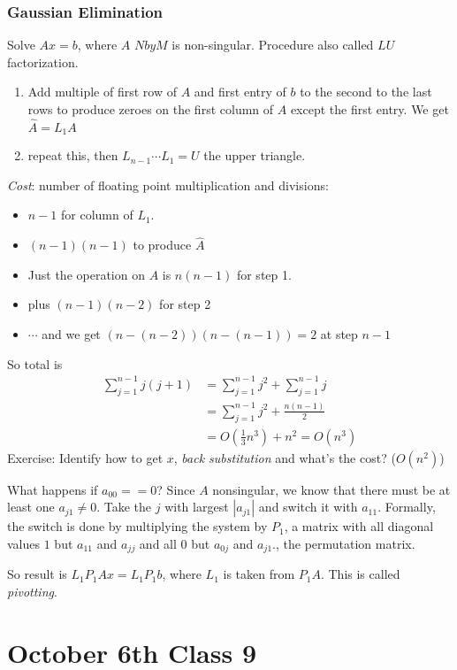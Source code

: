 \subsubsection{Gaussian Elimination}
\label{sec:gaussian}
Solve $Ax=b$, where $A$ $NbyM$ is non-singular. Procedure also called $LU$
factorization.
\begin{enumerate}
\item Add multiple of first row of $A$ and first entry of $b$ to the
  second to the last rows to produce zeroes on the first column of $A$
  except the first entry. We get $\hat A = L_1A$
\item repeat this, then $L_{n-1}\cdots L_1=U$ the upper triangle.
\end{enumerate}

\emph{Cost}: number of floating point multiplication and divisions:
\begin{itemize}
\item $n-1$ for column of $L_1$.
\item $(n-1)(n-1)$  to produce $\hat A$
\item Just the operation on $A$ is $n(n-1)$ for step 1.
\item plus $(n-1)(n-2)$ for step 2
\item $\cdots$ and we get $(n-(n-2))(n-(n-1)) = 2$ at step $n-1$
\end{itemize}
So total is 
\begin{align*}
  \sum_{j=1}^{n-1}j(j+1)&= \sum_{j=1}^{n-1}j^2 + \sum_{j=1}^{n-1}j\\
&=\sum_{j=1}^{n-1}j^2 + \frac{n(n-1)}{2}\\
&= O(\frac{1}{3}n^3) + n^2 = O(n^3)
\end{align*}
Exercise: Identify how to get $x$, \emph{back substitution} and what's
the cost? ($O(n^2)$)

What happens if $a_{00} == 0$?
Since $A$ nonsingular, we know that there must be at least one
$a_{j1}\neq 0$. Take the $j$ with largest $|a_{j1}|$ and switch it
with $a_{11}$. Formally, the switch is done by multiplying the system
by $P_1$, a matrix with all diagonal values $1$ but $a_{11}$ and
$a_{jj}$ and all 0 but $a_{0j}$ and $a_{j1}$., the permutation matrix.

So result is $L_1P_1Ax = L_1P_1b$, where $L_1$ is taken from
$P_1A$. This is called \emph{pivotting}.
\pagebreak

\section{October 6th Class 9}
\label{sec:class9}

